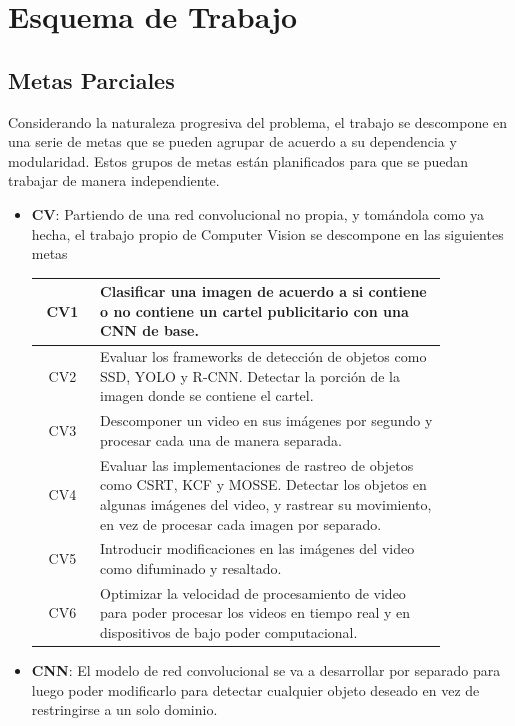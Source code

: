 \documentclass[a4paper]{article}
\begin{document}
\section{Esquema de Trabajo}
\subsection{Metas Parciales}

Considerando la naturaleza progresiva del problema, el trabajo se descompone en una serie de metas que se pueden agrupar de acuerdo a su dependencia y modularidad. Estos grupos de metas están planificados para que se puedan trabajar de manera independiente.

\begin{itemize}
\item \textbf{CV}: Partiendo de una red convolucional no propia, y tomándola como ya hecha, el trabajo propio de Computer Vision se descompone en las siguientes metas

\begin{center}
\begin{tabular}{c m{0.85\linewidth}} \toprule
    CV1 & Clasificar una imagen de acuerdo a si contiene o no contiene un cartel publicitario con una CNN de base. \\ \midrule
    CV2 & Evaluar los frameworks de detección de objetos como SSD, YOLO y R-CNN. \newline Detectar la porción de la imagen donde se contiene el cartel. \\ \midrule
    CV3 & Descomponer un video en sus imágenes por segundo y procesar cada una de manera separada. \\ \midrule
    CV4 & Evaluar las implementaciones de rastreo de objetos como CSRT, KCF y MOSSE. \newline Detectar los objetos en algunas imágenes del video, y rastrear su movimiento, en vez de procesar cada imagen por separado. \\ \midrule
    CV5 & Introducir modificaciones en las imágenes del video como difuminado y resaltado. \\ \midrule
    CV6 & Optimizar la velocidad de procesamiento de video para poder procesar los videos en tiempo real y en dispositivos de bajo poder computacional. \\ \bottomrule
\end{tabular}
\end{center}

\item \textbf{CNN}: El modelo de red convolucional se va a desarrollar por separado para luego poder modificarlo para detectar cualquier objeto deseado en vez de restringirse a un solo dominio.


\end{itemize}
\end{document}
